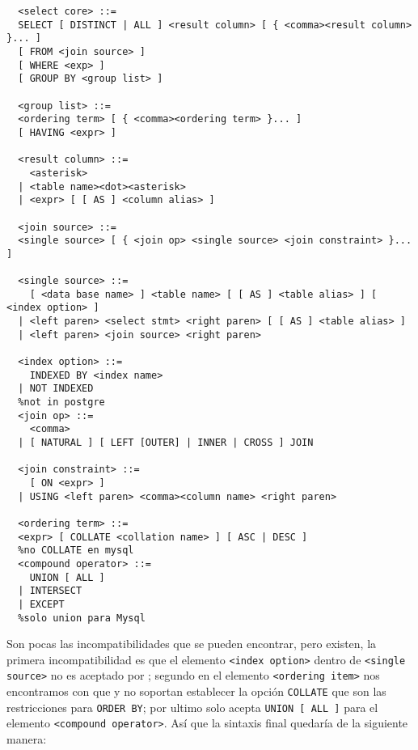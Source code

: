 \begin{Verbatim}
  <select core> ::=
  SELECT [ DISTINCT | ALL ] <result column> [ { <comma><result column> }... ] 
  [ FROM <join source> ]
  [ WHERE <exp> ]
  [ GROUP BY <group list> ]
  
  <group list> ::=
  <ordering term> [ { <comma><ordering term> }... ]
  [ HAVING <expr> ]
  
  <result column> ::=
    <asterisk>
  | <table name><dot><asterisk>
  | <expr> [ [ AS ] <column alias> ]
  
  <join source> ::=
  <single source> [ { <join op> <single source> <join constraint> }... ]
  
  <single source> ::=
    [ <data base name> ] <table name> [ [ AS ] <table alias> ] [ <index option> ]
  | <left paren> <select stmt> <right paren> [ [ AS ] <table alias> ]
  | <left paren> <join source> <right paren>
  
  <index option> ::=
    INDEXED BY <index name> 
  | NOT INDEXED
  %not in postgre
  <join op> ::=
    <comma>
  | [ NATURAL ] [ LEFT [OUTER] | INNER | CROSS ] JOIN
  
  <join constraint> ::=
    [ ON <expr> ]
  | USING <left paren> <comma><column name> <right paren>
  
  <ordering term> ::=
  <expr> [ COLLATE <collation name> ] [ ASC | DESC ]
  %no COLLATE en mysql
  <compound operator> ::=
    UNION [ ALL ]
  | INTERSECT 
  | EXCEPT
  %solo union para Mysql
\end{Verbatim}
Son pocas las incompatibilidades que se pueden encontrar, pero existen, la primera incompatibilidad es que el elemento \verb=<index option>= dentro de \verb=<single source>= no es aceptado por \p; segundo en el elemento \verb=<ordering item>= nos encontramos con que \m y \p no soportan establecer la opción \verb=COLLATE= que son las restricciones para \verb=ORDER BY=; por ultimo \m solo acepta \verb=UNION [ ALL ]= para el elemento \verb=<compound operator>=. Así que la sintaxis final quedaría de la siguiente manera:  

